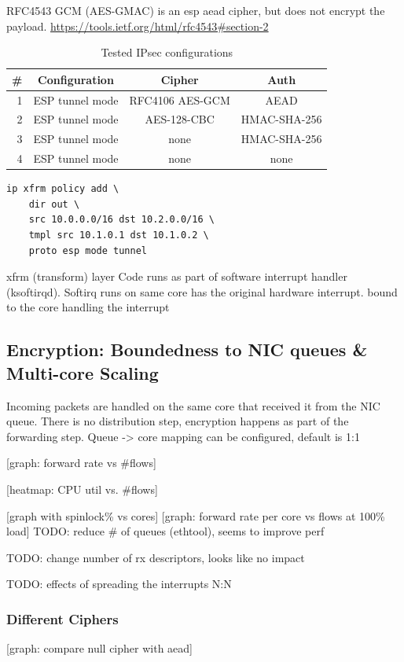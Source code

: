 \documentclass[IN,11pt,twoside,openright,master,english]{tumthesis}
\begin{document}
RFC4543 GCM (AES-GMAC) is an esp aead cipher, but does not encrypt the payload. 
\url{https://tools.ietf.org/html/rfc4543#section-2}

\begin{table}[h]
	\centering
	\begin{tabular}{r c c c}
		\# & Configuration & Cipher & Auth \\ 
		\hline 
		1 & ESP tunnel mode & RFC4106 AES-GCM & AEAD\\
		2 & ESP tunnel mode & AES-128-CBC & HMAC-SHA-256 \\
		3 & ESP tunnel mode & none & HMAC-SHA-256 \\
		4 & ESP tunnel mode & none & none\\
	\end{tabular}
	\caption{Tested IPsec configurations}
	\label{tab:ipsec-config}
\end{table}

\begin{lstlisting}[caption={iproute2 command to create a SP on the gateway host},captionpos=b,label={lst:create-SP}]
ip xfrm policy add \
	dir out \
	src 10.0.0.0/16 dst 10.2.0.0/16 \
	tmpl src 10.1.0.1 dst 10.1.0.2 \
	proto esp mode tunnel
\end{lstlisting}


xfrm (transform) layer
Code runs as part of software interrupt handler (ksoftirqd). Softirq runs on same core has the original hardware interrupt.
bound to the core handling the interrupt

\subsection{Encryption: Boundedness to NIC queues \& Multi-core Scaling}
Incoming packets are handled on the same core that received it from the NIC queue. 
There is no distribution step, encryption happens as part of the forwarding step.
Queue -> core mapping can be configured, default is 1:1

[graph: forward rate vs \#flows]

[heatmap: CPU util vs. \#flows]

[graph with spinlock\% vs cores]
[graph: forward rate per core vs flows at 100\% load]
TODO: reduce \# of queues (ethtool), seems to improve perf

TODO: change number of rx descriptors, looks like no impact

TODO: effects of spreading the interrupts N:N

\subsubsection{Different Ciphers}
[graph: compare null cipher with aead]
\end{document}
